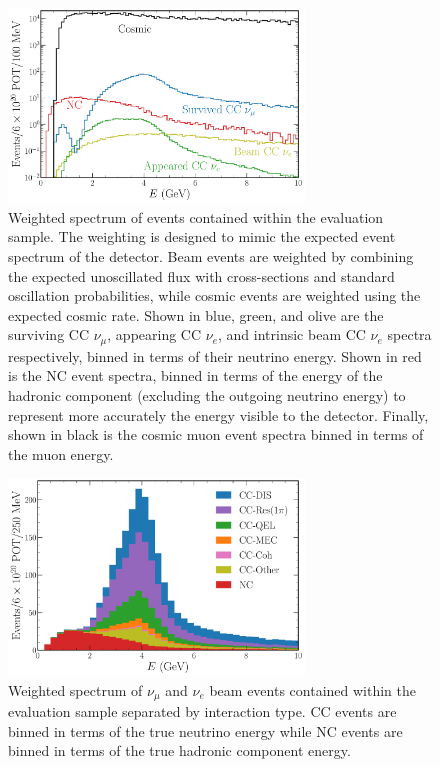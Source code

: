 \begin{figure} %
    \includegraphics[width=0.7\textwidth]{diagrams/7-results/explore_osc_fluxes.pdf}
    \caption[Weighted spectrum of evaluation sample events]
    {Weighted spectrum of events contained within the evaluation sample. The weighting is designed
        to mimic the expected event spectrum of the \chipsfive detector. Beam events are weighted
        by combining the expected unoscillated flux with cross-sections and standard oscillation
        probabilities, while cosmic events are weighted using the expected cosmic rate. Shown in
        blue, green, and olive are the surviving CC $\nu_{\mu}$, appearing CC $\nu_{e}$, and
        intrinsic beam CC $\nu_{e}$ spectra respectively, binned in terms of their neutrino
        energy. Shown in red is the NC event spectra, binned in terms of the energy of the
        hadronic component (excluding the outgoing neutrino energy) to represent more accurately
        the energy visible to the detector. Finally, shown in black is the cosmic muon event
        spectra binned in terms of the muon energy.}
    \label{fig:explore_osc_fluxes}
\end{figure}

\begin{figure} %
    \includegraphics[width=0.7\textwidth]{diagrams/7-results/explore_stacked_int_types.pdf}
    \caption[Weighted spectrum of interaction types within the evaluation sample]
    {Weighted spectrum of $\nu_{\mu}$ and $\nu_{e}$ beam events contained within the evaluation
        sample separated by interaction type. CC events are binned in terms of the true neutrino
        energy while NC events are binned in terms of the true hadronic component energy.}
    \label{fig:explore_stacked_int_types}
\end{figure}

